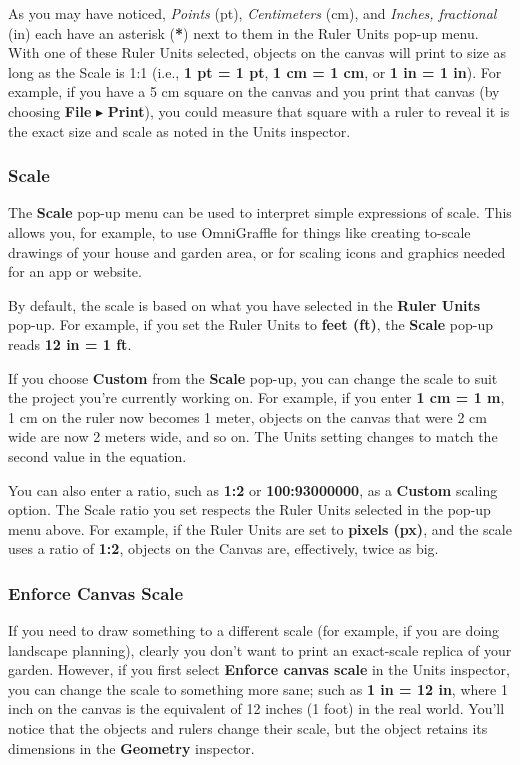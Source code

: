 \documentclass[../main.tex]{subfiles}
\begin{document}
As you may have noticed, \textit{Points} (pt), \textit{Centimeters} (cm), and \textit{Inches,
fractional} (in) each have an asterisk (\textbf{*}) next to them in the Ruler Units pop-up
menu. With one of these Ruler Units selected, objects on the canvas will print to size as long
as the Scale is 1:1 (i.e., \textbf{1 pt = 1 pt}, \textbf{1 cm = 1 cm}, or \textbf{1 in = 1
in}). For example, if you have a 5 cm square on the canvas and you print that canvas (by
choosing \textbf{File} $\blacktriangleright$ \textbf{Print}), you could measure that square
with a ruler to reveal it is the exact size and scale as noted in the Units inspector.

\subsubsection{Scale}

The \textbf{Scale} pop-up menu can be used to interpret simple expressions of scale. This allows
you, for example, to use OmniGraffle for things like creating to-scale drawings of your house
and garden area, or for scaling icons and graphics needed for an app or website.

By default, the scale is based on what you have selected in the \textbf{Ruler Units} pop-up. For
example, if you set the Ruler Units to \textbf{feet (ft)}, the \textbf{Scale} pop-up reads
\textbf{12 in = 1 ft}.


If you choose \textbf{Custom} from the \textbf{Scale} pop-up, you can change the scale to suit
the project you're currently working on. For example, if you enter \textbf{1 cm = 1 m}, 1 cm
on the ruler now becomes 1 meter, objects on the canvas that were 2 cm wide are now 2 meters
wide, and so on. The Units setting changes to match the second value in the equation.

You can also enter a ratio, such as \textbf{1:2} or \textbf{100:93000000}, as a \textbf{Custom}
scaling option. The Scale ratio you set respects the Ruler Units selected in the pop-up menu
above. For example, if the Ruler Units are set to \textbf{pixels (px)}, and the scale uses a
ratio of \textbf{1:2}, objects on the Canvas are, effectively, twice as big.

\subsubsection{Enforce Canvas Scale}

If you need to draw something to a different scale (for example, if you are doing landscape
planning), clearly you don't want to print an exact-scale replica of your garden. However, if
you first select \textbf{Enforce canvas scale} in the Units inspector, you can change the
scale to something more sane; such as \textbf{1 in = 12 in}, where 1 inch on the canvas is the
equivalent of 12 inches (1 foot) in the real world. You'll notice that the objects and rulers
change their scale, but the object retains its dimensions in the \textbf{Geometry} inspector.
\end{document}
